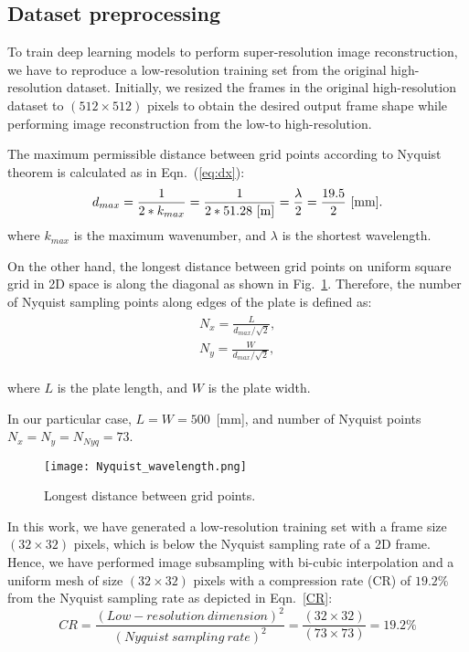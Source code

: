 \subsection{Dataset preprocessing}
To train deep learning models to perform super-resolution image reconstruction, we have to reproduce a low-resolution training set from the original high-resolution dataset. 
Initially, we resized the frames in the original high-resolution dataset to \((512\times512)\) pixels to obtain the desired output frame shape while performing image reconstruction from the low-to high-resolution.

The maximum permissible distance between grid points according to Nyquist theorem is calculated as in Eqn.~(\ref{eq:dx}):
\begin{equation}
	d_{max}= \frac{1}{2*k_{max}} = \frac{1}{2*51.28\ [\textup{m}]} = \frac{\lambda}{2} = \frac{19.5}{2}\ \textup{[mm]}.
	\label{eq:dx}	
\end{equation} 
where $k_{max}$ is the maximum wavenumber, and $\lambda$ is the shortest wavelength.

On the other hand, the longest distance between grid points on uniform square grid in 2D space is along the diagonal as shown in Fig.~\ref{fig:Nyquist}.
Therefore, the number of Nyquist sampling points along edges of the plate is defined as:
\begin{align}
	\begin{split}
		N_x= \frac{L}{d_{max}/\sqrt{2}}, \\
		N_y=  \frac{W}{d_{max}/\sqrt{2}},
	\end{split}
	\label{eq:Nyq}
\end{align}

where $L$ is the plate length, and $W$ is the plate width.

In our particular case, $L=W=500$~[mm], and number of Nyquist points $N_x= N_y= N_{Nyq} =73$.

\begin{figure} [!h]
	\centering
	\texttt{[image: Nyquist\_wavelength.png]}
	\caption{Longest distance between grid points.}
	\label{fig:Nyquist}
\end{figure}


In this work, we have generated a low-resolution training set with a frame size \((32\times32)\) pixels, which is below the Nyquist sampling rate of a 2D frame.
Hence, we have performed image subsampling with bi-cubic interpolation and a uniform mesh of size \((32\times32)\) pixels with a compression rate (CR) of \(19.2\%\) from the Nyquist sampling rate as depicted in Eqn.~\ref{CR}:
\begin{equation}
	CR = \frac{(Low-resolution\ dimension)^2}{(Nyquist\ sampling\ rate)^2} = \frac{(32\times32)}{(73\times73)}=19.2\%
	\label{CR}
\end{equation}

